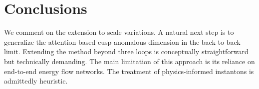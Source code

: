 \section{Conclusions}\label{sec:conclusions}

We comment on the extension to scale variations. A natural next step is
to generalize the attention-based cusp anomalous dimension in the
back-to-back limit. Extending the method beyond three loops is
conceptually straightforward but technically demanding. The main
limitation of this approach is its reliance on end-to-end energy flow
networks. The treatment of physics-informed instantons is admittedly
heuristic.

